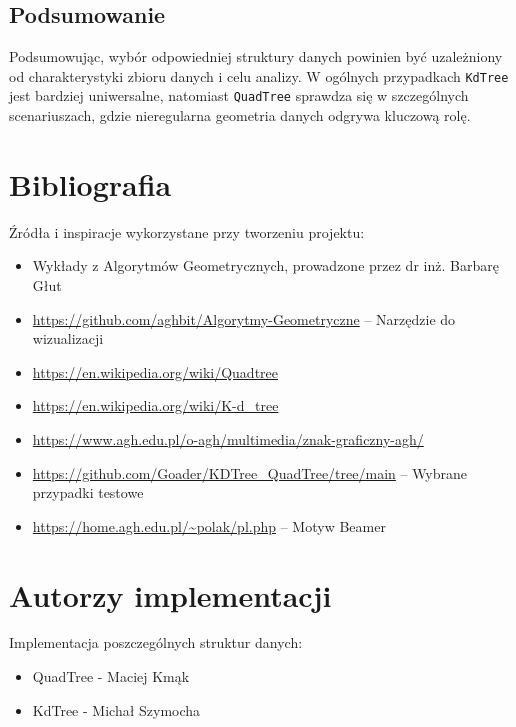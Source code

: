 \documentclass[12pt]{article}
\begin{document}
\subsection{Podsumowanie}

Podsumowując, wybór odpowiedniej struktury danych powinien być uzależniony od charakterystyki zbioru danych i celu analizy. W ogólnych przypadkach \texttt{KdTree} jest bardziej uniwersalne, natomiast \texttt{QuadTree} sprawdza się w szczególnych scenariuszach, gdzie nieregularna geometria danych odgrywa kluczową rolę.

\newpage
\pagestyle{plain}
\section*{Bibliografia}
\noindent Źródła i inspiracje wykorzystane przy tworzeniu projektu:
\begin{itemize}
  \item Wykłady z Algorytmów Geometrycznych, prowadzone przez dr inż. Barbarę Głut
  \item \url{https://github.com/aghbit/Algorytmy-Geometryczne} -- Narzędzie do wizualizacji
  \item \url{https://en.wikipedia.org/wiki/Quadtree}
  \item \url{https://en.wikipedia.org/wiki/K-d_tree}
  \item \url{https://www.agh.edu.pl/o-agh/multimedia/znak-graficzny-agh/}
  \item \url{https://github.com/Goader/KDTree_QuadTree/tree/main} -- Wybrane przypadki testowe
  \item \url{https://home.agh.edu.pl/~polak/pl.php} -- Motyw Beamer
\end{itemize}
\section*{Autorzy implementacji}
Implementacja poszczególnych struktur danych:
\begin{itemize}
  \item QuadTree - Maciej Kmąk
  \item KdTree - Michał Szymocha
\end{itemize}
\end{document}
